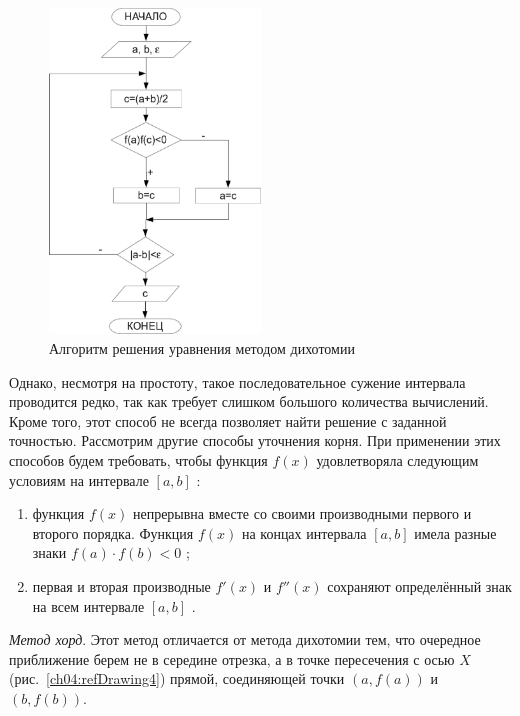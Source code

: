 \begin{figure}[htb]
\begin{center}
\includegraphics[width=0.5\textwidth]{img/ris_4_4}
\caption{Алгоритм решения уравнения методом дихотомии}
\label{ch04:refDrawing3}
\end{center}
\end{figure}

Однако, несмотря на простоту, такое последовательное сужение интервала проводится редко, так как требует слишком
большого количества вычислений. Кроме того, этот способ не всегда позволяет найти решение с заданной точностью.
Рассмотрим другие способы уточнения корня. При применении этих способов будем требовать, чтобы функция  $f(x)$ 
удовлетворяла следующим условиям на интервале  $[a,b]$ :
\begin{enumerate}
\item функция  $f(x)$  непрерывна вместе со своими производными первого и второго порядка. Функция  $f(x)$  на концах
интервала  $[a,b]$  имела разные знаки  $f(a)\cdot f(b)<0$ ;
\item первая и вторая производные  $f'(x)$  и  $f''(x)$ сохраняют определённый
знак на всем интервале  $[a,b]$ .
\end{enumerate}

\emph{Метод хорд}. Этот метод отличается от метода дихотомии тем, что очередное приближение берем не в
середине отрезка, а в точке пересечения с осью $X$ (рис.~\ref{ch04:refDrawing4}) прямой, соединяющей точки 
$(a,f(a))$ и  $(b,f(b))$.

